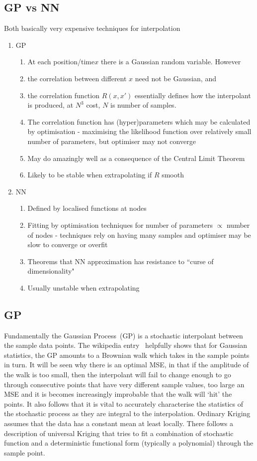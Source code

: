 \subsection{GP vs NN}\label{sec:gpvsnn}
Both basically very expensive techniques for interpolation
\begin{enumerate}
\item GP 
\begin{enumerate}
\item At each position/time$x$ there is a Gaussian random variable. However
\item the correlation between different $x$ need not be Gaussian, and 
\item the correlation function $R(x,x')$ essentially defines how the interpolant is produced, at $N^3$ cost, $N$ is number of samples.
\item The correlation function has (hyper)parameters which may be calculated by optimisation - maximising the likelihood function over relatively small number of parameters, but optimiser may not converge
\item May do amazingly well as a consequence of the Central Limit Theorem
\item Likely to be stable when extrapolating if $R$ smooth
\end{enumerate}
\item NN
\begin{enumerate}
\item Defined by localised functions at nodes
\item Fitting by optimisation techniques for number of parameters $\propto$ number of nodes - techniques rely on having many samples and optimiser may be slow to converge or overfit
\item Theorems that NN approximation has resistance to ``curse of dimensionality"
\item Usually unstable when extrapolating
\end{enumerate}
\end{enumerate}

\subsection{GP}\label{sec:gp}
Fundamentally the Gaussian Process~(GP) is a stochastic interpolant between the
sample data points. The wikipedia entry~\cite{krigingwiki} helpfully shows that for
Gaussian statistics, the GP amounts to a Brownian walk which takes in the sample
points in turn. It will be seen why there is an optimal MSE, in that if the amplitude
of the walk is too small,
then the interpolant will fail to change enough to go through consecutive points that have
very different sample values,  too large an MSE
and it is becomes increasingly improbable that the walk will `hit' the points.
It also follows that it is vital to accurately characterise the statistics of
the stochastic process as they are integral to the interpolation.
Ordinary Kriging assumes that the data has a constant mean at least locally.
There follows a description of universal Kriging that tries to fit a
combination of stochastic function and a deterministic functional
form (typically a polynomial) through the sample point.


